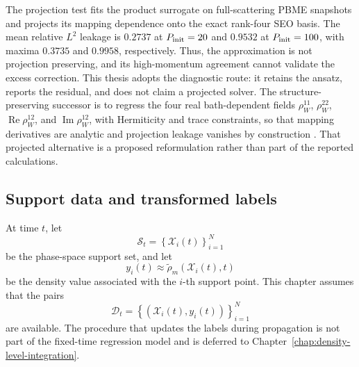 \documentclass[
  11pt,
  letterpaper,
  onehalfspacing,
  normalmargins,
  equalmargins,
  oneside
]{ut-thesis}
\begin{document}
The projection test fits the product surrogate on full-scattering
PBME snapshots and projects its mapping dependence onto the exact rank-four
SEO basis. The mean relative \(L^2\) leakage is \(0.2737\) at
\(P_{\rm init}=20\) and \(0.9532\) at \(P_{\rm init}=100\), with maxima
\(0.3735\) and \(0.9958\),
respectively. Thus, the approximation is not projection preserving, and its
high-momentum agreement cannot validate the excess correction. This thesis
adopts the diagnostic route: it retains the ansatz, reports the residual, and
does not claim a projected solver. The structure-preserving successor is to
regress the four real bath-dependent fields
\(\rho_W^{11}\), \(\rho_W^{22}\),
\(\operatorname{Re}\rho_W^{12}\), and
\(\operatorname{Im}\rho_W^{12}\), with Hermiticity and trace constraints, so
that mapping derivatives are analytic and projection leakage vanishes by
construction \cite{Kelly2012JCP,RunesonRichardson2019,RunesonRichardson2020}.
That projected alternative is a proposed reformulation rather than part of the
reported calculations.


\subsection{Support data and transformed labels}
\label{subsec:support-points-density-data}

At time \(t\), let
\begin{equation}
\mathcal S_t
=
\left\{
\boldsymbol{\mathcal X}_i(t)
\right\}_{i=1}^{N}
\label{eq:gp-support-set}
\end{equation}
be the phase-space support set, and let
\begin{equation}
 y_i(t)
\approx
\tilde\rho_m\!\left(\boldsymbol{\mathcal X}_i(t),t\right)
\label{eq:gp-density-labels}
\end{equation}
be the density value associated with the \(i\)-th support point. This chapter
assumes that the pairs
\begin{equation}
\mathcal D_t
=
\left\{
\left(
\boldsymbol{\mathcal X}_i(t),y_i(t)
\right)
\right\}_{i=1}^{N}
\label{eq:gp-fixed-time-data}
\end{equation}
are available. The procedure that updates the labels during propagation is not
part of the fixed-time regression model and is deferred to
Chapter~\ref{chap:density-level-integration}.
\end{document}
